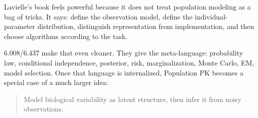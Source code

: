 \documentclass[a4paper]{article}
\begin{document}
Lavielle's book feels powerful because it does not treat population modeling as a bag of tricks. It says: define the observation model, define the individual-parameter distribution, distinguish representation from implementation, and then choose algorithms according to the task.

6.008/6.437 make that even cleaner. They give the meta-language: probability law, conditional independence, posterior, risk, marginalization, Monte Carlo, EM, model selection. Once that language is internalized, Population PK becomes a special case of a much larger idea:
\begin{quote}
  Model biological variability as latent structure, then infer it from noisy observations.
\end{quote}



\end{document}
